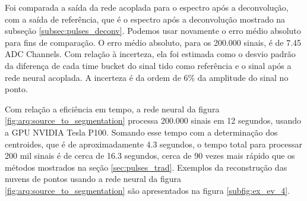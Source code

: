 \documentclass[a4paper,12pt,oneside]{book}
\begin{document}
\par Foi comparada a saída da rede acoplada para o espectro após a deconvolução, com a saída de referência, que é o espectro após a deconvolução mostrado na subseção \ref{subsec:pulses_deconv}. Podemos usar novamente o erro médio absoluto para fins de comparação. O erro médio absoluto, para os 200.000 sinais, é de 7.45 ADC Channels. Com relação à incerteza, ela foi estimada como o desvio padrão da diferença de cada time bucket do sinal tido como referência e o sinal após a rede neural acoplada. A incerteza é da ordem de 6\% da amplitude do sinal no ponto.

\par Com relação a eficiência em tempo, a rede neural da figura \ref{fig:arq:source_to_segmentation} processa 200.000 sinais em 12 segundos, usando a GPU NVIDIA Tesla P100. Somando esse tempo com a determinação dos centroides, que é de aproximadamente 4.3 segundos, o tempo total para processar 200 mil sinais é de cerca de 16.3 segundos, cerca de 90 vezes mais rápido que os métodos mostrados na seção \ref{sec:pulses_trad}. Exemplos da reconstrução das nuvens de pontos usando a rede neural da figura \ref{fig:arq:source_to_segmentation} são apresentados na figura \ref{subfig:ex_ev_4}.
\end{document}
